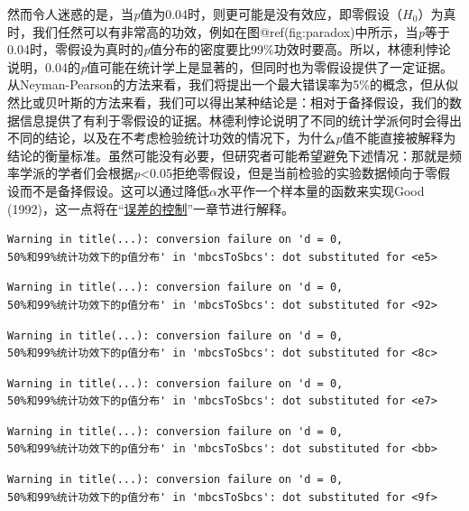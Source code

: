 \documentclass[
  letterpaper,
  DIV=11,
  numbers=noendperiod]{scrreprt}
\begin{document}
然而令人迷惑的是，当\emph{p}值为0.04时，则更可能是没有效应，即零假设（\(H_0\)）为真时，我们任然可以有非常高的功效，例如在图@ref(fig:paradox)中所示，当\emph{p}等于0.04时，零假设为真时的\emph{p}值分布的密度要比99\%功效时要高。所以，林德利悖论说明，0.04的\emph{p}值可能在统计学上是显著的，但同时也为零假设提供了一定证据。从Neyman-Pearson的方法来看，我们将提出一个最大错误率为5\%的概念，但从似然比或贝叶斯的方法来看，我们可以得出某种结论是：相对于备择假设，我们的数据信息提供了有利于零假设的证据。林德利悖论说明了不同的统计学派何时会得出不同的结论，以及在不考虑检验统计功效的情况下，为什么\emph{p}值不能直接被解释为结论的衡量标准。虽然可能没有必要，但研究者可能希望避免下述情况：那就是频率学派的学者们会根据\emph{p}\textless0.05拒绝零假设，但是当前检验的实验数据倾向于零假设而不是备择假设。这可以通过降低\(\alpha\)水平作一个样本量的函数来实现Good
(1992)，这一点将在``\protect\hyperlink{errorcontrol}{误差的控制}''一章节进行解释。

\begin{verbatim}
Warning in title(...): conversion failure on 'd = 0,
50%和99%统计功效下的p值分布' in 'mbcsToSbcs': dot substituted for <e5>
\end{verbatim}

\begin{verbatim}
Warning in title(...): conversion failure on 'd = 0,
50%和99%统计功效下的p值分布' in 'mbcsToSbcs': dot substituted for <92>
\end{verbatim}

\begin{verbatim}
Warning in title(...): conversion failure on 'd = 0,
50%和99%统计功效下的p值分布' in 'mbcsToSbcs': dot substituted for <8c>
\end{verbatim}

\begin{verbatim}
Warning in title(...): conversion failure on 'd = 0,
50%和99%统计功效下的p值分布' in 'mbcsToSbcs': dot substituted for <e7>
\end{verbatim}

\begin{verbatim}
Warning in title(...): conversion failure on 'd = 0,
50%和99%统计功效下的p值分布' in 'mbcsToSbcs': dot substituted for <bb>
\end{verbatim}

\begin{verbatim}
Warning in title(...): conversion failure on 'd = 0,
50%和99%统计功效下的p值分布' in 'mbcsToSbcs': dot substituted for <9f>
\end{verbatim}
\end{document}
